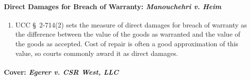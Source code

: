 \paragraph{Direct Damages for Breach of Warranty: \emph{Manouchehri v. Heim}}

\begin{enumerate}
    \item UCC \S\ 2-714(2) sets the measure of direct damages for breach of 
    warranty as the difference between the value of the goods as warranted and 
    the value of the goods as accepted. Cost of repair is often a good 
    approximation of this value, so courts commonly award it as direct 
    damages.
\end{enumerate}

\paragraph{Cover: \emph{Egerer v. CSR West, LLC}}

